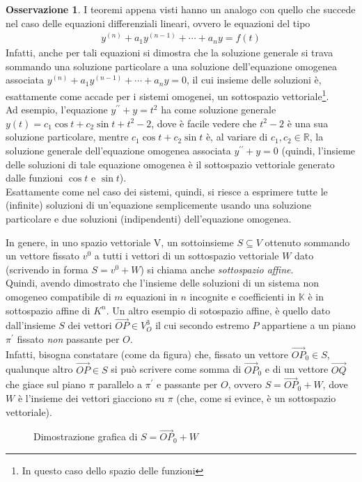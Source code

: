 \documentclass{book}
\theoremstyle{definition}
\newtheorem{oss}{Osservazione}[section]
\theoremstyle{plain}
\begin{document}
\begin{oss}
  \label{oss:gauss-jordan2}
  I teoremi appena visti hanno un analogo con quello che succede nel caso delle equazioni
  differenziali lineari, ovvero le equazioni del tipo
  \begin{eqnarray*}
    y^{(n)}+a_1y^{(n-1)}+\cdots+a_ny=f(t)
  \end{eqnarray*}
  Infatti, anche per tali equazioni si dimostra che la soluzione generale si trava
  sommando una soluzione particolare a una soluzione dell'equazione omogenea associata
  $y^{(n)}+a_1y^{(n-1)}+\cdots+a_ny=0$, il cui insieme delle soluzioni è, esattamente come
  accade per i sistemi omogenei, un sottospazio vettoriale\footnote{In questo caso dello
    spazio delle funzioni}.\\
  Ad esempio, l'equazione $y^{\prime\prime}+y=t^2$ ha come soluzione generale
  $y(t)=c_1\cos t+ c_2\sin t+t^2-2$, dove è facile vedere che $t^2-2$ è una sua soluzione
  particolare, mentre $c_1\cos t +c_2\sin t$ è, al variare di $c_1,c_2\in \mathds{R}$, la
  soluzione generale dell'equazione omogenea associata $y^{\prime\prime}+y=0$ (quindi, l'insieme
  delle soluzioni di tale equazione omogenea è il sottospazio vettoriale generato dalle
  funzioni $\cos t$ e $\sin t$).\\
  Esattamente come nel caso dei sistemi, quindi, si riesce a esprimere tutte le (infinite) soluzioni
  di un'equazione semplicemente usando una soluzione particolare e due soluzioni (indipendenti)
  dell'equazione omogenea.
\end{oss}
In genere, in uno spazio vettoriale V, un sottoinsieme $S\subseteq V$ ottenuto sommando un vettore
fissato $v^0$ a tutti i vettori di un sottospazio vettoriale $W$ dato (scrivendo in forma $S=v^0+W$)
si chiama anche \textit{sottospazio affine}.\\
Quindi, avendo dimostrato che l'insieme delle soluzioni di un sistema non omogeneo compatibile di
$m$ equazioni in $n$ incognite e coefficienti in $\mathds{K}$ è in sottospazio affine di $K^n$.
Un altro esempio di sotospazio affine, è quello dato dall'insieme $S$ dei vettori $\vec{OP}\in V^3_O$
il cui secondo estremo $P$ appartiene a un piano $\pi^\prime$ fissato \textit{non} passante per $O$.\\
Infatti, bisogna constatare (come da figura) che, fissato un vettore $\vec{OP}_0\in S$, qualunque altro
$\vec{OP}\in S$ si può scrivere come somma di $\vec{OP}_0$ e di un vettore $\vec{OQ}$ che giace sul
piano $\pi$ parallelo a $\pi^\prime$ e passante per $O$, ovvero $S=\vec{OP}_0+W$, dove $W$ è l'insieme
dei vettori giacciono su $\pi$ (che, come si evince, è un sottospazio vettoriale).
\begin{figure}[ht!]
  \centering
  
  \caption{Dimostrazione grafica di $S=\vec{OP}_0+W$}
  \label{fig:OP0piuW}
\end{figure}
\end{document}
